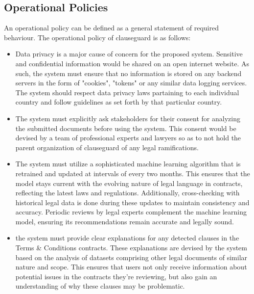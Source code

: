 \subsection{Operational Policies}
An operational policy can be defined as a general statement of required behaviour. The operational policy of clauseguard is as follows: 
\begin{itemize}
    \item Data privacy is a major cause of concern for the proposed system. Sensitive and confidential information would be shared on an open internet website. As such, the system must ensure that no information is stored on any backend servers in the form of "cookies", "tokens" or any similar data logging services. The system should respect data privacy laws partaining to each individual country and follow guidelines as set forth by that particular country. 
    
    \item The system must explicitly ask stakeholders for their consent for analyzing the submitted documents before using the system. This consent would be devised by a team of professional experts and lawyers so as to not hold the parent organization of clauseguard of any legal ramifications. 

    \item The system must utilize a sophisticated machine learning algorithm that is retrained and updated at intervals of every two months. This ensures that the model stays current with the evolving nature of legal language in contracts, reflecting the latest laws and regulations. Additionally, cross-checking with historical legal data is done during these updates to maintain consistency and accuracy. Periodic reviews by legal experts complement the machine learning model, ensuring its recommendations remain accurate and legally sound.

    \item the system must provide clear explanations for any detected clauses in the Terms & Conditions contracts. These explanations are devised by the system based on the analysis of datasets comprising other legal documents of similar nature and scope. This ensures that users not only receive information about potential issues in the contracts they're reviewing, but also gain an understanding of why these clauses may be problematic.
\end{itemize}

